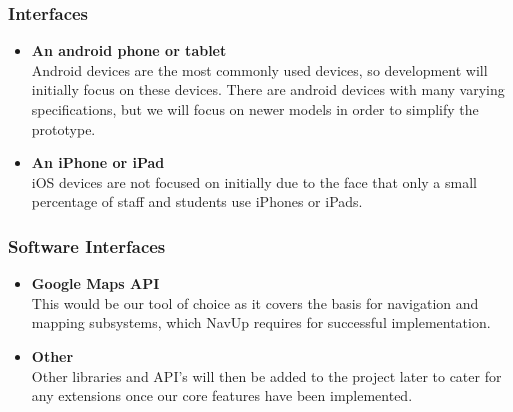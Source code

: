 \documentclass[english]{article}
\begin{document}
    					\subsubsection{Interfaces}
    						\begin{itemize}
    						    \item \textbf{An android phone or tablet} \\
    						    Android devices are the most commonly used devices, so development will initially focus on these devices. There are android devices with many varying specifications, but we will focus on newer models in order to simplify the prototype. \\
    						    \item \textbf{An iPhone or iPad} \\
    						    iOS devices are not focused on initially due to the face that only a small percentage of staff and students use iPhones or iPads.
    						\end{itemize}
    						
    					\subsubsection{Software Interfaces}
        					\begin{itemize}
        					    \item \textbf{Google Maps API}\\
        					    This would be our tool of choice as it covers the basis for navigation and mapping subsystems, which NavUp requires for successful implementation.
        					    \item \textbf{Other}\\
        					    Other libraries and API's will then be added to the project later to cater for any extensions once our core features have been implemented.
        					\end{itemize}
\end{document}
